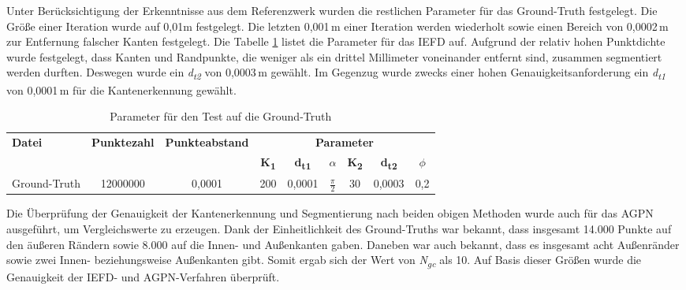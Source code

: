 Unter Berücksichtigung der Erkenntnisse aus dem Referenzwerk wurden die restlichen Parameter für das Ground-Truth festgelegt. Die Größe einer Iteration wurde auf 0,01m festgelegt. Die letzten 0,001\,\si{\m} einer Iteration werden wiederholt sowie einen Bereich von 0,0002\,\si{\m} zur Entfernung falscher Kanten festgelegt. Die Tabelle \ref{table: parameters_test1} listet die Parameter für das IEFD auf. Aufgrund der relativ hohen Punktdichte wurde festgelegt, dass Kanten und Randpunkte, die weniger als ein drittel Millimeter voneinander entfernt sind, zusammen segmentiert werden durften. Deswegen wurde ein \textit{d\textsubscript{t2}} von 0,0003\,\si{\m} gewählt. Im Gegenzug wurde zwecks einer hohen Genauigkeitsanforderung ein \textit{d\textsubscript{t1}} von 0,0001\,\si{\m} für die Kantenerkennung gewählt.

\begin{table}
	\centering
	\begin{tabular}[width=\textwidth]{l *{8}{c}}
		\hline
		\multirow{2}{*}{\textbf{Datei}}&\multirow{2}{*}{\textbf{Punktezahl}}&\multirow{2}{*}{\textbf{Punkteabstand}}&\multicolumn{6}{c}{\textbf{Parameter}}\\
		& & & \textbf{K\textsubscript{1}} & \textbf{d\textsubscript{t1}} & \textbf{$\alpha$} & \textbf{K\textsubscript{2}} & \textbf{d\textsubscript{t2}} & \textbf{$\phi$} \\
		\hline
		Ground-Truth & 12000000 & 0,0001 & 200 & 0,0001 & $\frac{\pi}{2}$ & 30 & 0,0003 & 0,2 \\
		\hline
	\end{tabular}
	\caption{Parameter für den Test auf die Ground-Truth}
	\label{table: parameters_test1}
\end{table}

Die Überprüfung der Genauigkeit der Kantenerkennung und Segmentierung nach beiden obigen Methoden wurde auch für das AGPN ausgeführt, um Vergleichswerte zu erzeugen. Dank der Einheitlichkeit des Ground-Truths war bekannt, dass insgesamt 14.000 Punkte auf den äußeren Rändern sowie 8.000 auf die Innen- und Außenkanten gaben. Daneben war auch bekannt, dass es insgesamt acht Außenränder sowie zwei Innen- beziehungsweise Außenkanten gibt. Somit ergab sich der Wert von \textit{N\textsubscript{gc}} als 10. Auf Basis dieser Größen wurde die Genauigkeit der IEFD- und AGPN-Verfahren überprüft.

